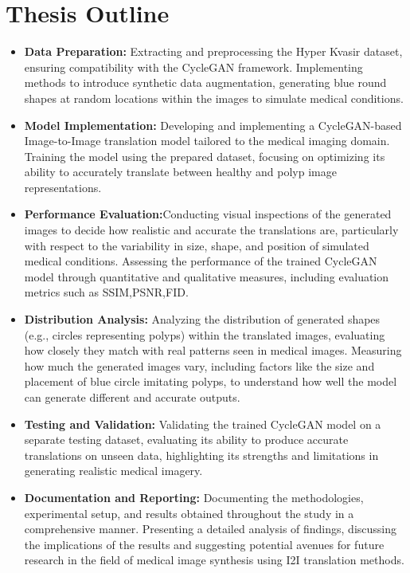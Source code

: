 \documentclass[UKenglish,12pt]{master-style}
\begin{document}
\section{Thesis Outline}
\begin{itemize}
\item \textbf{Data Preparation:} Extracting and preprocessing the Hyper Kvasir dataset, ensuring compatibility with the CycleGAN framework.
Implementing methods to introduce synthetic data augmentation, generating blue round shapes at random locations within the images to simulate medical conditions.

\item \textbf{Model Implementation:} Developing and implementing a CycleGAN-based Image-to-Image translation model tailored to the medical imaging domain.
Training the model using the prepared dataset, focusing on optimizing its ability to accurately translate between healthy and polyp image representations.

\item \textbf{Performance Evaluation:}Conducting visual inspections of the generated images to decide how realistic and accurate the translations are, particularly with respect to the variability in size, shape, and position of simulated medical conditions. Assessing the performance of the trained CycleGAN model through quantitative and qualitative measures, including evaluation metrics such as SSIM,PSNR,FID.

\item \textbf{Distribution Analysis:} Analyzing the distribution of generated shapes (e.g., circles representing polyps) within the translated images, evaluating how closely they match with real patterns seen in medical images. Measuring how much the generated images vary, including factors like the size and placement of blue circle imitating polyps, to understand how well the model can generate different and accurate outputs.

\item \textbf{Testing and Validation:} Validating the trained CycleGAN model on a separate testing dataset, evaluating its ability to produce accurate translations on unseen data, highlighting its strengths and limitations in generating realistic medical imagery.

\item \textbf{Documentation and Reporting:} Documenting the methodologies, experimental setup, and results obtained throughout the study in a comprehensive manner. Presenting a detailed analysis of findings, discussing the implications of the results and suggesting potential avenues for future research in the field of medical image synthesis using I2I translation methods.
\end{itemize}
\end{document}
